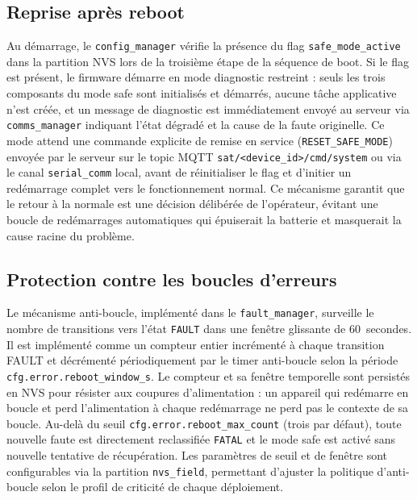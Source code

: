 \subsection{Reprise après reboot}
\label{subsec:reboot_resume}

Au démarrage, le \texttt{config\_manager} vérifie la présence du
flag \texttt{safe\_mode\_active} dans la partition NVS lors de la
troisième étape de la séquence de boot. Si le flag est présent, le
firmware démarre en mode diagnostic restreint : seuls les trois
composants du mode safe sont initialisés et démarrés, aucune tâche
applicative n'est créée, et un message de diagnostic est immédiatement
envoyé au serveur via \texttt{comms\_manager} indiquant l'état dégradé
et la cause de la faute originelle. Ce mode attend une commande
explicite de remise en service (\texttt{RESET\_SAFE\_MODE}) envoyée
par le serveur sur le topic MQTT \texttt{sat/<device\_id>/cmd/system}
ou via le canal \texttt{serial\_comm} local, avant de réinitialiser
le flag et d'initier un redémarrage complet vers le fonctionnement
normal. Ce mécanisme garantit que le retour à la normale est une
décision délibérée de l'opérateur, évitant une boucle de redémarrages
automatiques qui épuiserait la batterie et masquerait la cause racine
du problème.

\subsection{Protection contre les boucles d'erreurs}
\label{subsec:antiloop}

Le mécanisme anti-boucle, implémenté dans le \texttt{fault\_manager},
surveille le nombre de transitions vers l'état \texttt{FAULT} dans
une fenêtre glissante de 60~secondes. Il est implémenté comme un
compteur entier incrémenté à chaque transition FAULT et décrémenté
périodiquement par le timer anti-boucle selon la période
\texttt{cfg.error.reboot\_window\_s}. Le compteur et sa fenêtre
temporelle sont persistés en NVS pour résister aux coupures
d'alimentation : un appareil qui redémarre en boucle et perd
l'alimentation à chaque redémarrage ne perd pas le contexte de sa
boucle. Au-delà du seuil \texttt{cfg.error.reboot\_max\_count}
(trois par défaut), toute nouvelle faute est directement reclassifiée
\texttt{FATAL} et le mode safe est activé sans nouvelle tentative
de récupération. Les paramètres de seuil et de fenêtre sont
configurables via la partition \texttt{nvs\_field}, permettant
d'ajuster la politique d'anti-boucle selon le profil de criticité
de chaque déploiement.

